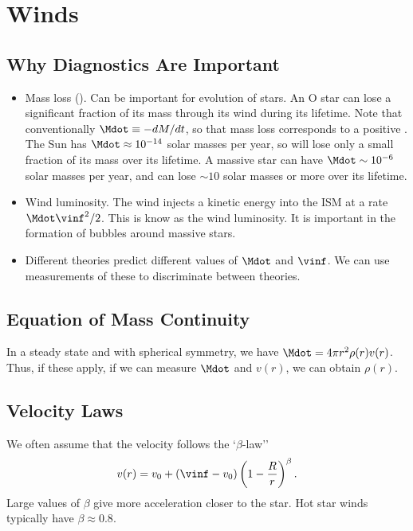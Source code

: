 
\chapter{Winds}

\section{Why Diagnostics Are Important}

\begin{itemize}

\item Mass loss (\Mdot). Can be important for evolution of stars. An O star can lose a significant fraction of its mass through its wind during its lifetime. Note that conventionally $\Mdot \equiv -dM/dt$, so that mass loss corresponds to a positive \Mdot. The Sun has $\Mdot \approx  10^{-14}$ solar masses per year, so will lose only a small fraction of its mass over its lifetime. A massive star can have $\Mdot \sim 10^{-6}$ solar masses per year, and can lose $\sim 10$ solar masses or more over its lifetime.

\item Wind luminosity. The wind injects a  kinetic energy into the ISM at a rate $\Mdot \vinf^2/2$. This is know as the wind luminosity. It is important in the formation of bubbles around massive stars.

\item Different theories predict different values of $\Mdot$ and $\vinf$. We can use measurements of these to discriminate between theories.

\end{itemize}

\section{Equation of Mass Continuity}

In a steady state and with spherical symmetry, we have $\Mdot = 4\pi r^2 \rho(r) v(r)$. Thus, if these apply, if we can measure $\Mdot$ and $v(r)$, we can obtain $\rho(r)$.

\section{Velocity Laws}

We often assume that the velocity follows the `$\beta$-law''
$$
v(r) = v_0 + (\vinf - v_0)\left(1 - \frac{R}{r}\right)^\beta.
$$
Large values of $\beta$ give more acceleration closer to the star. Hot star winds typically have $\beta \approx 0.8$.

